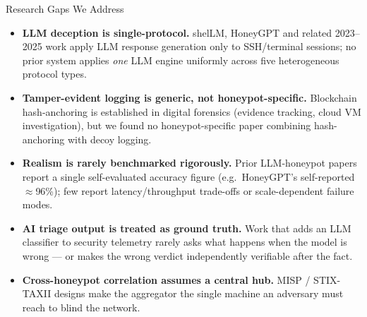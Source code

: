 \documentclass[aspectratio=169,11pt]{beamer}
\begin{document}
\begin{frame}{Research Gaps We Address}
  \footnotesize
  \begin{itemize}\setlength\itemsep{4pt}
    \item \textbf{LLM deception is single-protocol.} shelLM, HoneyGPT and related 2023--2025
      work apply LLM response generation only to SSH/terminal sessions; no prior system applies
      \emph{one} LLM engine uniformly across five heterogeneous protocol types.
    \item \textbf{Tamper-evident logging is generic, not honeypot-specific.} Blockchain
      hash-anchoring is established in digital forensics (evidence tracking, cloud VM
      investigation), but we found no honeypot-specific paper combining hash-anchoring
      with decoy logging.
    \item \textbf{Realism is rarely benchmarked rigorously.} Prior LLM-honeypot papers report a
      single self-evaluated accuracy figure (e.g.\ HoneyGPT's self-reported $\approx$96\%);
      few report latency/throughput trade-offs or scale-dependent failure modes.
    \item \textbf{AI triage output is treated as ground truth.} Work that adds an LLM classifier
      to security telemetry rarely asks what happens when the model is wrong --- or makes
      the wrong verdict independently verifiable after the fact.
    \item \textbf{Cross-honeypot correlation assumes a central hub.} MISP / STIX-TAXII designs
      make the aggregator the single machine an adversary must reach to blind the network.
  \end{itemize}
\end{frame}
\end{document}
